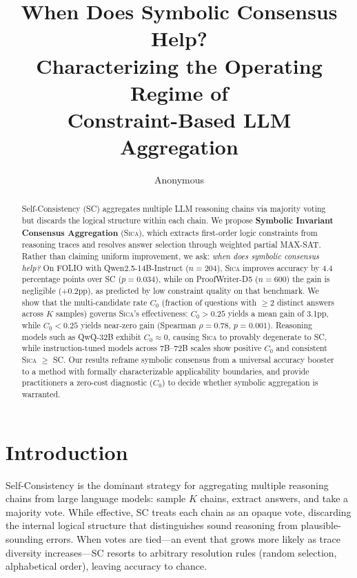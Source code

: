 \documentclass[11pt,a4paper]{article}
\title{When Does Symbolic Consensus Help?\\Characterizing the Operating Regime of\\Constraint-Based LLM Aggregation}
\author{Anonymous}
\newcommand{\sica}{\textsc{Sica}}
\begin{document}
\maketitle

\begin{abstract}
Self-Consistency (SC) aggregates multiple LLM reasoning chains via majority voting but discards the logical structure within each chain.
We propose \textbf{Symbolic Invariant Consensus Aggregation} (\sica{}), which extracts first-order logic constraints from reasoning traces and resolves answer selection through weighted partial MAX-SAT.
Rather than claiming uniform improvement, we ask: \emph{when does symbolic consensus help?}
On FOLIO with Qwen2.5-14B-Instruct ($n{=}204$), \sica{} improves accuracy by 4.4 percentage points over SC ($p{=}0.034$), while on ProofWriter-D5 ($n{=}600$) the gain is negligible (+0.2pp), as predicted by low constraint quality on that benchmark.
We show that the multi-candidate rate $C_0$ (fraction of questions with $\geq 2$ distinct answers across $K$ samples) governs \sica{}'s effectiveness: $C_0 > 0.25$ yields a mean gain of 3.1pp, while $C_0 < 0.25$ yields near-zero gain (Spearman $\rho{=}0.78$, $p{=}0.001$).
Reasoning models such as QwQ-32B exhibit $C_0 \approx 0$, causing \sica{} to provably degenerate to SC, while instruction-tuned models across 7B--72B scales show positive $C_0$ and consistent \sica{} $\geq$ SC.
Our results reframe symbolic consensus from a universal accuracy booster to a method with formally characterizable applicability boundaries, and provide practitioners a zero-cost diagnostic ($C_0$) to decide whether symbolic aggregation is warranted.
\end{abstract}

\section{Introduction}
\label{sec:intro}

Self-Consistency \citep{wang2023selfconsistency} is the dominant strategy for aggregating multiple reasoning chains from large language models: sample $K$ chains, extract answers, and take a majority vote.
While effective, SC treats each chain as an opaque vote, discarding the internal logical structure that distinguishes sound reasoning from plausible-sounding errors.
When votes are tied---an event that grows more likely as trace diversity increases---SC resorts to arbitrary resolution rules (random selection, alphabetical order), leaving accuracy to chance.
\end{document}
